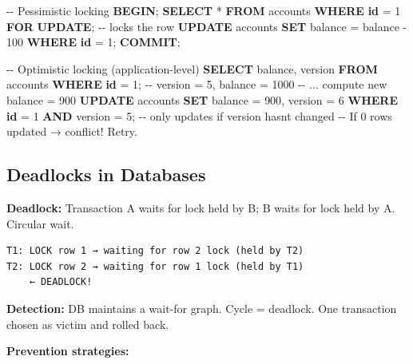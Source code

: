 \documentclass[11pt]{article}
\newenvironment{Shaded}{\begin{snugshade}}{\end{snugshade}}
\newcommand{\CommentTok}[1]{\textcolor[rgb]{0.48,0.49,0.49}{#1}}
\newcommand{\ControlFlowTok}[1]{\textcolor[rgb]{0.99,0.74,0.29}{\textbf{#1}}}
\newcommand{\DecValTok}[1]{\textcolor[rgb]{0.96,0.45,0.00}{#1}}
\newcommand{\KeywordTok}[1]{\textcolor[rgb]{0.81,0.81,0.76}{\textbf{#1}}}
\newcommand{\NormalTok}[1]{\textcolor[rgb]{0.81,0.81,0.76}{#1}}
\newcommand{\OperatorTok}[1]{\textcolor[rgb]{0.81,0.81,0.76}{#1}}
\begin{document}
\begin{Shaded}
\begin{Highlighting}[]
\CommentTok{{-}{-} Pessimistic locking}
\ControlFlowTok{BEGIN}\NormalTok{;}
\KeywordTok{SELECT} \OperatorTok{*} \KeywordTok{FROM}\NormalTok{ accounts }\KeywordTok{WHERE} \KeywordTok{id} \OperatorTok{=} \DecValTok{1} \ControlFlowTok{FOR} \KeywordTok{UPDATE}\NormalTok{;  }\CommentTok{{-}{-} locks the row}
\KeywordTok{UPDATE}\NormalTok{ accounts }\KeywordTok{SET}\NormalTok{ balance }\OperatorTok{=}\NormalTok{ balance }\OperatorTok{{-}} \DecValTok{100} \KeywordTok{WHERE} \KeywordTok{id} \OperatorTok{=} \DecValTok{1}\NormalTok{;}
\KeywordTok{COMMIT}\NormalTok{;}

\CommentTok{{-}{-} Optimistic locking (application{-}level)}
\KeywordTok{SELECT}\NormalTok{ balance, version }\KeywordTok{FROM}\NormalTok{ accounts }\KeywordTok{WHERE} \KeywordTok{id} \OperatorTok{=} \DecValTok{1}\NormalTok{;}
\CommentTok{{-}{-} version = 5, balance = 1000}
\CommentTok{{-}{-} ... compute new balance = 900}
\KeywordTok{UPDATE}\NormalTok{ accounts}
\KeywordTok{SET}\NormalTok{ balance }\OperatorTok{=} \DecValTok{900}\NormalTok{, version }\OperatorTok{=} \DecValTok{6}
\KeywordTok{WHERE} \KeywordTok{id} \OperatorTok{=} \DecValTok{1} \KeywordTok{AND}\NormalTok{ version }\OperatorTok{=} \DecValTok{5}\NormalTok{;  }\CommentTok{{-}{-} only updates if version hasn\textquotesingle{}t changed}
\CommentTok{{-}{-} If 0 rows updated → conflict! Retry.}
\end{Highlighting}
\end{Shaded}

\subsection{Deadlocks in Databases}\label{deadlocks-in-databases}

\textbf{Deadlock:} Transaction A waits for lock held by B; B waits for lock held by A. Circular wait.

\setcodelang{}

\begin{verbatim}
T1: LOCK row 1 → waiting for row 2 lock (held by T2)
T2: LOCK row 2 → waiting for row 1 lock (held by T1)
    ← DEADLOCK!
\end{verbatim}

\textbf{Detection:} DB maintains a wait-for graph. Cycle = deadlock. One transaction chosen as victim and rolled back.

\textbf{Prevention strategies:}
\end{document}
